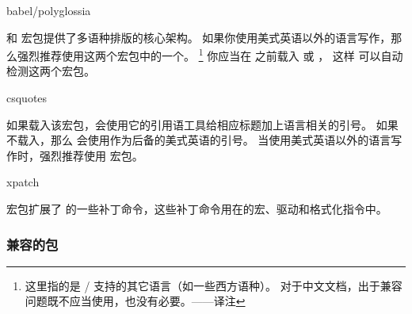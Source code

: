 \begin{marglist}

\item[babel/polyglossia]

 和  宏包提供了多语种排版的核心架构。
如果你使用美式英语以外的语言写作，那么强烈推荐使用这两个宏包中的一个。
\footnote{
这里指的是 / 支持的其它语言（如一些西方语种）。
对于中文文档，出于兼容问题既不应当使用，也没有必要。——译注}
你应当在 \biblatex 之前载入  或 ，
这样 \biblatex 可以自动检测这两个宏包。

\item[csquotes]

如果载入该宏包，\biblatex 会使用它的引用语工具给相应标题加上语言相关的引号。
如果不载入，那么 \biblatex 会使用作为后备的美式英语的引号。
当使用美式英语以外的语言写作时，强烈推荐使用  宏包。

\item[xpatch]

 宏包扩展了  的一些补丁命令，这些补丁命令用在\biblatex 的宏、驱动和格式化指令中。

\end{marglist}

\subsubsection{兼容的包}
\label{int:pre:cmp}

